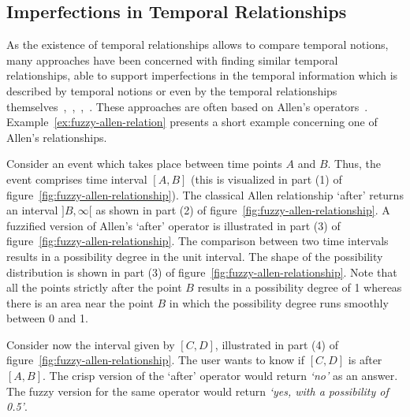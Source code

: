 \subsection{Imperfections in Temporal Relationships}
As the existence of temporal relationships allows to compare temporal notions, many approaches have been concerned with finding similar temporal relationships, able to support imperfections in the temporal information which is described by temporal notions or even by the temporal relationships themselves~\cite{ohlbach2004},~\cite{nagypal2003},~\cite{schockaert08},~\cite{Dubois:jucs_9_9:fuzziness_and_uncertainty_in}. These approaches are often based on Allen's operators~\cite{Allen83}. Example~\ref{ex:fuzzy-allen-relation} presents a short example concerning one of Allen's relationships.


\begin{example}
\label{ex:fuzzy-allen-relation}
Consider an event which takes place between time points $A$ and $B$. Thus, the event comprises time interval $[A,B]$ (this is visualized in part (1) of figure~\ref{fig:fuzzy-allen-relationship}). The classical Allen relationship `after' returns an interval $]B,\infty[$ as shown in part (2) of figure~\ref{fig:fuzzy-allen-relationship}. A fuzzified version of Allen's `after' operator is illustrated in part (3) of figure~\ref{fig:fuzzy-allen-relationship}. The comparison between two time intervals results in a possibility degree in the unit interval. The shape of the possibility distribution is shown in part (3) of figure~\ref{fig:fuzzy-allen-relationship}. Note that all the points strictly after the point $B$ results in a possibility degree of 1 whereas there is an area near the point $B$ in which the possibility degree runs smoothly between 0 and 1. 

Consider now the interval given by $[C,D]$, illustrated in part (4) of figure~\ref{fig:fuzzy-allen-relationship}. The user wants to know if $[C,D]$ is after $[A,B]$. The crisp version of the `after' operator would return \emph{`no'} as an answer. The fuzzy version for the same operator would return \emph{`yes, with a possibility of 0.5'}.



\end{example}
